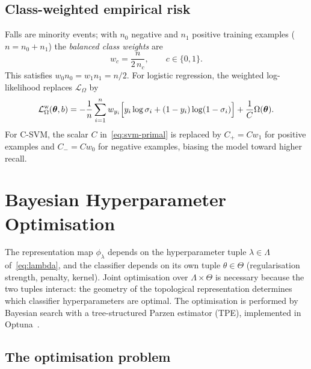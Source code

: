 \subsection{Class-weighted empirical risk}
\label{subsubsec:classweight}

Falls are minority events; with $n_0$ negative and $n_1$ positive training examples ($n=n_0+n_1$) the \emph{balanced class weights} are
\begin{equation}
  w_c=\frac{n}{2\,n_c},\qquad c\in\{0,1\}.
  \label{eq:cw}
\end{equation}
This satisfies $w_0n_0=w_1n_1=n/2$. For logistic regression, the weighted log-likelihood replaces $\mathcal{L}_\Omega$ by
\[
  \mathcal{L}_\Omega^{\mathrm{w}}(\boldsymbol\theta,b)
  =-\frac{1}{n}\sum_{i=1}^n w_{y_i}\Bigl[y_i\log\sigma_i+(1-y_i)\log(1-\sigma_i)\Bigr]
  +\frac{1}{C}\Omega(\boldsymbol\theta).
\]
For C-SVM, the scalar $C$ in~\eqref{eq:svm-primal} is replaced by $C_+=Cw_1$ for positive examples and $C_-=Cw_0$ for negative examples, biasing the model toward higher recall.

\section{Bayesian Hyperparameter Optimisation}
\label{subsec:bayesopt}

The representation map $\phi_\lambda$ depends on the hyperparameter tuple $\lambda\in\Lambda$ of~\eqref{eq:lambda}, and the classifier depends on its own tuple $\theta\in\Theta$ (regularisation strength, penalty, kernel). Joint optimisation over $\Lambda\times\Theta$ is necessary because the two tuples interact: the geometry of the topological representation determines which classifier hyperparameters are optimal. The optimisation is performed by Bayesian search with a tree-structured Parzen estimator (TPE), implemented in Optuna~\parencite{optuna}.

\subsection{The optimisation problem}
\label{subsubsec:opt-problem}

